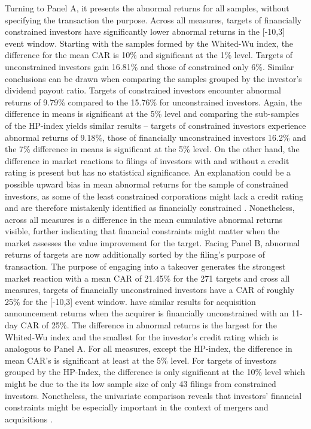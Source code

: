 \documentclass[12pt]{article}
\begin{document}
Turning to Panel A, it presents the abnormal returns for all samples, without specifying the transaction the purpose. Across all measures, targets of financially constrained investors have significantly lower abnormal returns in the [-10,3] event window. Starting with the samples formed by the Whited-Wu index, the difference for the mean CAR is 10\% and significant at the 1\% level. Targets of unconstrained investors gain 16.81\% and those of constrained only 6\%. Similar conclusions can be drawn when comparing the samples grouped by the investor's dividend payout ratio. Targets of constrained investors encounter abnormal returns of 9.79\% compared to the 15.76\% for unconstrained investors. Again, the difference in means is significant at the 5\% level and comparing the sub-samples of the HP-index yields similar results -- targets of constrained investors experience abnormal returns of 9.18\%, those of financially unconstrained investors 16.2\% and the 7\% difference in means is significant at the 5\% level. On the other hand, the difference in market reactions to filings of investors with and without a credit rating is present but has no statistical significance. An explanation could be a possible upward bias in mean abnormal returns for the sample of constrained investors, as some of the least constrained corporations might lack a credit rating and are therefore mistakenly identified as financially constrained \citep[p.18]{heller2015}.
Nonetheless, across all measures is a difference in the mean cumulative abnormal returns visible, further indicating that financial constraints might  matter when the market assesses the value improvement for the target.   
%
Facing Panel B, abnormal returns of targets are now additionally sorted by the filing's purpose of transaction. The purpose of engaging into a takeover generates the strongest market reaction with a mean CAR of 21.45\% for the 271 targets and cross all measures, targets of financially unconstrained investors have a CAR of roughly 25\% for the [-10,3] event window. \citet[p.112]{Khatami2014} have similar results for acquisition announcement returns when the acquirer is financially unconstrained with an 11-day CAR of 25\%. The difference in abnormal returns is the largest for the Whited-Wu index and the smallest for the investor's credit rating which is analogous to Panel A. For all measures, except the HP-index, the difference in mean CAR's is significant at least at the 5\% level. For targets of investors grouped by the HP-Index, the difference is only significant at the 10\% level which might be due to the its low sample size of only 43 filings from constrained investors. Nonetheless, the univariate comparison reveals that investors' financial constraints might be especially important in the context of mergers and acquisitions \citep[p.112]{Khatami2014}.
\end{document}
